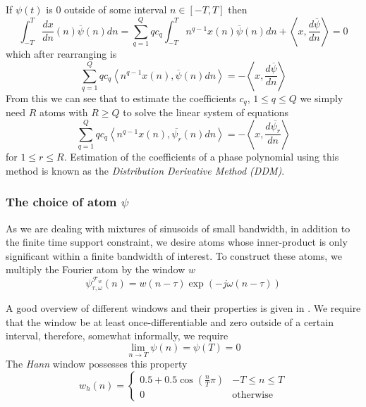 \documentclass[letterpaper,12pt]{report}
\begin{document}
If $\psi(t)$ is 0 outside of some interval $n \in [-T,T]$ then
\[
    \int_{-T}^{T} \frac{dx}{dn}(n)\overline{\psi}(n) dn
    = \sum_{q=1}^{Q} q c_q \int_{-T}^{T} n^{q-1} x(n) \overline{\psi}(n) dn
    + \left\langle x, \frac{d\overline{\psi}}{dn} \right\rangle = 0
\]
which after rearranging is
\[ 
    \sum_{q=1}^{Q} q c_q 
    \left\langle n^{q-1} x(n) , \overline{\psi}(n) dn \right\rangle
    = -\left\langle x, \frac{d\overline{\psi}}{dn} \right\rangle
\]
From this we can see that to estimate the coefficients $c_q$, $ 1 \leq q \leq Q
$ we simply need $R$ atoms with $R \geq Q$ to solve the linear system of
equations
\begin{equation}
    \label{eq:ddmsyseq}
    \sum_{q=1}^{Q} q c_q 
    \left\langle n^{q-1} x(n) , \overline{\psi_{r}}(n) dn \right\rangle
    = -\left\langle x, \frac{d\overline{\psi_{r}}}{dn} \right\rangle
\end{equation}
for $1 \leq r \leq R$. Estimation of the coefficients of a phase polynomial
using this method is known as the \textit{Distribution Derivative Method (DDM)}.

\subsubsection{The choice of atom $\psi$}

As we are dealing with mixtures of sinusoids of small bandwidth, in addition to
the finite time support constraint, we desire atoms whose inner-product is only
significant within a finite bandwidth of interest. To construct these atoms, we
multiply the Fourier atom by the window $w$
\[
    \psi_{\tau,\omega}^{\mathcal{F}_{w}}(n) = w(n-\tau) \exp(-j\omega(n-\tau))
\]

A good overview of different windows and their properties is given in
\cite{harris1978use}. We require that the window be at least
once-differentiable and zero outside of a certain interval, therefore, somewhat
informally, we require
\[
    \lim_{n \rightarrow T} \psi(n) = \psi(T) = 0
\]
The \textit{Hann} window possesses this property
\[
    w_{h}(n) = \begin{cases}
        0.5 + 0.5 \cos \left( \frac{n}{T}\pi \right) & -T \leq n \leq T \\
        0 & \text{otherwise}
    \end{cases}
\]
\end{document}

